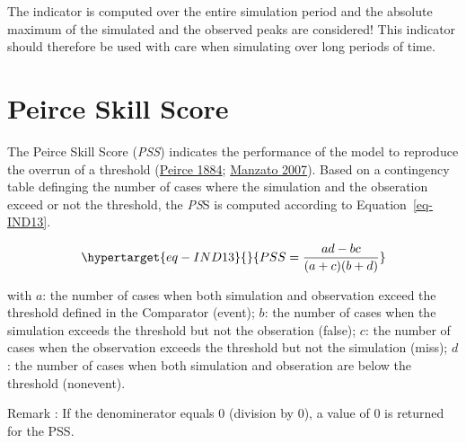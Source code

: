 \documentclass[
  letterpaper,
  DIV=11,
  numbers=noendperiod]{scrreprt}
\begin{document}
\begin{tcolorbox}[standard jigsaw,left=2mm, arc=.35mm, toprule=.15mm, colbacktitle=quarto-callout-warning-color!10!white, coltitle=black, leftrule=.75mm, bottomtitle=1mm, colframe=quarto-callout-warning-color-frame, colback=white, toptitle=1mm, titlerule=0mm, rightrule=.15mm, title=\textcolor{quarto-callout-warning-color}{\faExclamationTriangle}\hspace{0.5em}{Warning}, bottomrule=.15mm, opacityback=0, opacitybacktitle=0.6]
The indicator is computed over the entire simulation period and the
absolute maximum of the simulated and the observed peaks are considered!
This indicator should therefore be used with care when simulating over
long periods of time.
\end{tcolorbox}

\hypertarget{sec-tech_performance_indicators_pierce}{%
\chapter{Peirce Skill
Score}\label{sec-tech_performance_indicators_pierce}}

The Peirce Skill Score (\emph{PSS}) indicates the performance of the
model to reproduce the overrun of a threshold
(\protect\hyperlink{ref-peirce_numerical_1884}{Peirce 1884};
\protect\hyperlink{ref-manzato_note_2007}{Manzato 2007}). Based on a
contingency table definging the number of cases where the simulation and
the obseration exceed or not the threshold, the \emph{PS}S is computed
according to Equation~\ref{eq-IND13}.

\begin{equation}\protect\hypertarget{eq-IND13}{}{
PSS = \frac{ad - bc}{(a + c)(b + d)}
}\label{eq-IND13}\end{equation}

with \(a\): the number of cases when both simulation and observation
exceed the threshold defined in the Comparator (event); \(b\): the
number of cases when the simulation exceeds the threshold but not the
obseration (false); \(c\): the number of cases when the observation
exceeds the threshold but not the simulation (miss); \(d\): the number
of cases when both simulation and obseration are below the threshold
(nonevent).

\begin{tcolorbox}[standard jigsaw,left=2mm, arc=.35mm, toprule=.15mm, colbacktitle=quarto-callout-note-color!10!white, coltitle=black, leftrule=.75mm, bottomtitle=1mm, colframe=quarto-callout-note-color-frame, colback=white, toptitle=1mm, titlerule=0mm, rightrule=.15mm, title=\textcolor{quarto-callout-note-color}{\faInfo}\hspace{0.5em}{Note}, bottomrule=.15mm, opacityback=0, opacitybacktitle=0.6]
Remark : If the denominerator equals 0 (division by 0), a value of 0 is
returned for the PSS.
\end{tcolorbox}
\end{document}
